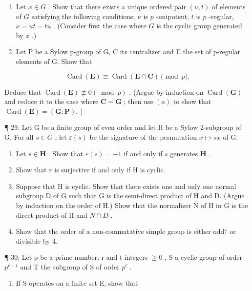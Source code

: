 \begin{enumerate}
\def\labelenumi{(\alph{enumi})}
\item
  Let \(x \in G\) . Show that there exists a unique ordered pair \((u, t)\) of elements of \(G\) satisfying the following conditions: \(u\) is \(p\) -unipotent, \(t\) is \(p\) -regular, \(x = ut = tu\) . (Consider first the case where \(G\) is the cyclic group generated by \(x\) .)
\item
  Let P be a Sylow p-group of G, C its centralizer and E the set of p-regular elements of G. Show that
\end{enumerate}

\[
\operatorname{Card} (\mathbf {E}) \equiv \operatorname{Card} (\mathbf {E} \cap \mathbf {C}) \pmod {p}.
\]

Deduce that \(\operatorname{Card}(\mathbf{E}) \not\equiv 0 (\bmod p)\) . (Argue by induction on \(\operatorname{Card}(\mathbf{G})\) and reduce it to the case where \(\mathbf{C} = \mathbf{G}\) ; then use \((a)\) to show that \(\operatorname{Card}(\mathbf{E}) = (\mathbf{G}:\mathbf{P}).\) )

¶ 29. Let G be a finite group of even order and let H be a Sylow 2-subgroup of G. For all \(s \in G\) , let \(\varepsilon(s)\) be the signature of the permutation \(x \mapsto sx\) of G.

\begin{enumerate}
\def\labelenumi{(\alph{enumi})}
\item
  Let \(s \in \mathbf{H}\) . Show that \(\varepsilon(s) = -1\) if and only if \(s\) generates \(\mathbf{H}\) .
\item
  Show that \(\varepsilon\) is surjective if and only if H is cyclic.
\item
  Suppose that H is cyclic. Show that there exists one and only one normal subgroup D of G such that G is the semi-direct product of H and D. (Argue by induction on the order of H.) Show that the normalizer N of H in G is the direct product of H and \(N \cap D\) .
\item
  Show that the order of a non-commutative simple group is either odd† or divisible by 4.
\end{enumerate}

¶ 30. Let p be a prime number, r and t integers \(\geqslant0\) , S a cyclic group of order \(p^{r+t}\) and T the subgroup of S of order \(p^{t}\) .

\begin{enumerate}
\def\labelenumi{(\alph{enumi})}
\tightlist
\item
  If S operates on a finite set E, show that
\end{enumerate}


